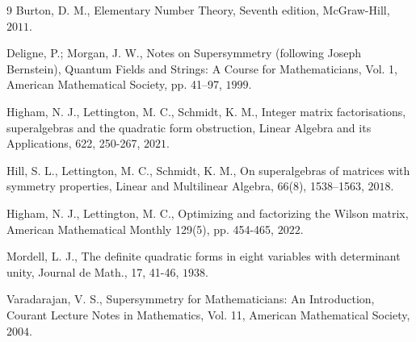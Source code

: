 \documentclass{amsart}
\theoremstyle{plain}
\theoremstyle{definition}
\begin{document}
\begin{thebibliography}{9}
Burton, D. M., Elementary Number Theory, Seventh edition, McGraw-Hill, $2011$.

Deligne, P.; Morgan, J. W., Notes on Supersymmetry (following Joseph Bernstein), Quantum Fields and Strings: A Course for Mathematicians, Vol. 1, American Mathematical Society, pp. 41–97, $1999$.

Higham, N. J., Lettington, M. C., Schmidt, K. M., Integer matrix factorisations, superalgebras and the quadratic form obstruction, Linear Algebra and its Applications, 622, 250-267, $2021$.

Hill, S. L., Lettington, M. C., Schmidt, K. M., On superalgebras of matrices with symmetry properties, Linear and Multilinear Algebra, 66(8), 1538–1563, $2018$.

Higham, N. J., Lettington, M. C., Optimizing and factorizing the Wilson matrix, American Mathematical Monthly 129(5), pp. 454-465, $2022$.

Mordell, L. J., The definite quadratic forms in eight variables with determinant unity, Journal de Math., 17, 41-46, $1938$.

Varadarajan, V. S., Supersymmetry for Mathematicians: An Introduction, Courant Lecture Notes in Mathematics, Vol. 11, American Mathematical Society, $2004$.

\end{thebibliography}
\end{document}
